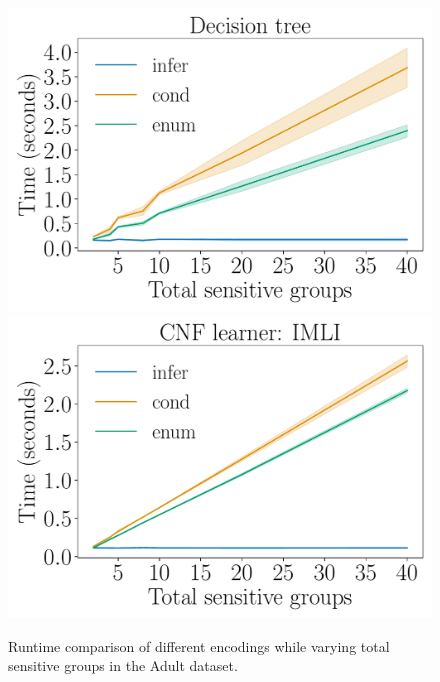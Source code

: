 \begin{figure}[t!]
	\begin{center}
		\includegraphics[scale=.35]{figures/fairness/justicia/encoding_runtime_Adult_DT.pdf}
		\includegraphics[scale=.35]{figures/fairness/justicia/encoding_runtime_Adult_IMLI.pdf}
		\hfill
		\caption[Runtime of different encodings in {\justicia}]{Runtime comparison of different encodings while varying total sensitive groups in the Adult dataset.}
		\label{fairness_justicia_fig:runtime_diff_encodings}
	\end{center}
\end{figure}



